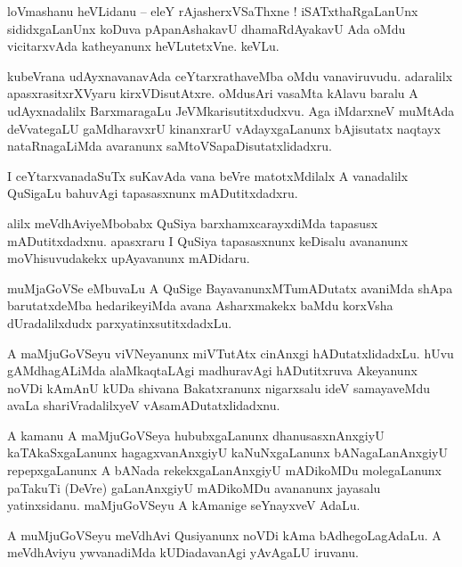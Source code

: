 \documentclass{article}
\begin{document}
\begin{mn}%
loVmashanu heVLidanu -- eleY rAjasherxVSaThxne ! iSATxthaRgaLanUnx sididxgaLanUnx koDuva 
pApanAshakavU dhamaRdAyakavU Ada oMdu vicitarxvAda katheyanunx heVLutetxVne. keVLu.
\end{mn}

\begin{mn}%
kubeVrana udAyxnavanavAda ceYtarxrathaveMba oMdu vanaviruvudu. adaralilx apasxrasitxrXVyaru 
kirxVDisutAtxre. oMdusAri vasaMta kAlavu baralu A udAyxnadalilx BarxmaragaLu JeVMkarisutitxdudxvu. 
Aga iMdarxneV muMtAda deVvategaLU gaMdharavxrU kinanxrarU vAdayxgaLanunx bAjisutatx naqtayx 
nataRnagaLiMda avaranunx saMtoVSapaDisutatxlidadxru.
\end{mn}

\begin{mn}%
I ceYtarxvanadaSuTx suKavAda vana beVre matotxMdilalx A vanadalilx QuSigaLu bahuvAgi tapasasxnunx 
mADutitxdadxru.
\end{mn}

\begin{mn}%
alilx meVdhAviyeMbobabx QuSiya barxhamxcarayxdiMda tapasusx mADutitxdadxnu. apasxraru I QuSiya 
tapasasxnunx keDisalu avananunx moVhisuvudakekx upAyavanunx mADidaru.
\end{mn}

\begin{mn}%
muMjaGoVSe eMbuvaLu A QuSige BayavanunxMTumADutatx avaniMda shApa barutatxdeMba hedarikeyiMda avana 
Asharxmakekx baMdu korxVsha dUradalilxdudx parxyatinxsutitxdadxLu.
\end{mn}

\begin{mn}%
A maMjuGoVSeyu viVNeyanunx miVTutAtx cinAnxgi hADutatxlidadxLu. hUvu gAMdhagALiMda alaMkaqtaLAgi 
madhuravAgi hADutitxruva Akeyanunx noVDi kAmAnU kUDa shivana Bakatxranunx nigarxsalu ideV 
samayaveMdu avaLa shariVradalilxyeV vAsamADutatxlidadxnu.
\end{mn}

\begin{mn}%
A kamanu A maMjuGoVSeya hububxgaLanunx dhanusasxnAnxgiyU kaTAkaSxgaLanunx hagagxvanAnxgiyU 
kaNuNxgaLanunx bANagaLanAnxgiyU repepxgaLanunx A  bANada rekekxgaLanAnxgiyU mADikoMDu molegaLanunx 
paTakuTi (DeVre) gaLanAnxgiyU mADikoMDu avananunx jayasalu yatinxsidanu. maMjuGoVSeyu A kAmanige 
seYnayxveV AdaLu.
\end{mn}

\begin{mn}%
A muMjuGoVSeyu meVdhAvi Qusiyanunx noVDi kAma bAdhegoLagAdaLu. A meVdhAviyu ywvanadiMda 
kUDiadavanAgi yAvAgaLU iruvanu.
\end{mn}
\end{document}
